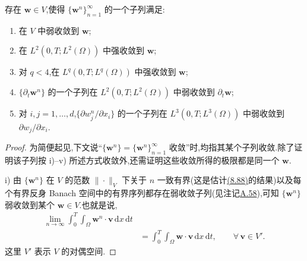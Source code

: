 \begin{lemma}[收敛子列的存在性]
\label{lem:smagorinsky-convergent-subsequence}
存在 $\bm{w}\in V$,使得 $\{\bm{w}^n\}_{n=1}^\infty$ 的一个子列满足:
\begin{enumerate}[label=\roman*)]
 \item 在 $V$ 中弱收敛到 $\bm{w}$;
 \item 在 $L^2(0,T;L^2(\Omega))$ 中强收敛到 $\bm{w}$;
 \item 对 $q<4$,在 $L^q(0,T;L^q(\Omega))$ 中强收敛到 $\bm{w}$;
 \item $\{\partial_t\bm{w}^n\}$ 的一个子列在 $L^2(0,T;L^2(\Omega))$ 中弱收敛到 $\partial_t\bm{w}$;
 \item 对 $i,j=1,\ldots,d$,$\{\partial w_j^n/\partial x_i\}$ 的一个子列在 $L^3(0,T;L^3(\Omega))$ 中弱收敛到 $\partial w_j/\partial x_i$.
\end{enumerate}
\begin{proof}
为简便起见,下文说“$\{\bm{w}^n\}=\{\bm{w}^n\}_{n=1}^\infty$ 收敛”时,均指其某个子列收敛.除了证明该子列按 i)–v) 所述方式收敛外,还需证明这些收敛所得的极限都是同一个 $\bm{w}$.

i) 由 $\{\bm{w}^n\}$ 在 $V$ 的范数 $\|\cdot\|_V$ 下关于 $n$ 一致有界(这是估计\hyperref[eq:smagorinsky-galerkin-h1-estimate]{(8.88)}的结果)以及每个有界反身 Banach 空间中的有界序列都存在弱收敛子列(见注记\hyperref[note:appendix-a-58]{A.58}),可知 $\{\bm{w}^n\}$ 弱收敛到某个 $\bm{w}\in V$.也就是说,
\begin{equation}\label{eq:smagorinsky-weak-limit}
\begin{aligned}
 \lim_{n\to\infty}\int_0^T\int_\Omega
      \bm{w}^n\cdot\bm{v}\,\mathrm{d}x\,\mathrm{d}t\\
 &=\int_0^T\int_\Omega
      \bm{w}\cdot\bm{v}\,\mathrm{d}x\,\mathrm{d}t,
 \qquad \forall\,\bm{v}\in V'.
\end{aligned}
\end{equation}
这里 $V'$ 表示 $V$ 的对偶空间.


\end{proof}
\end{lemma}
